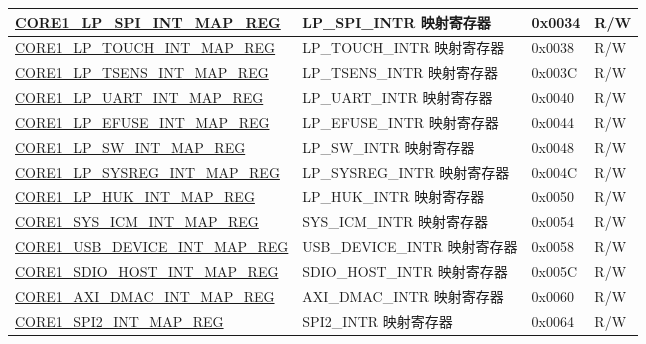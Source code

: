 \begin{longtable}{ | p{8.7cm} | p{6.2cm} | p{1.3cm} | p{1cm} | }
\hyperref[regdesc:CORE1LPSPIINTMAPREG]{CORE1\_LP\_SPI\_INT\_MAP\_REG} & LP\_SPI\_INTR 映射寄存器 & 0x0034 & R/W \\ \hline

\hyperref[regdesc:CORE1LPTOUCHINTMAPREG]{CORE1\_LP\_TOUCH\_INT\_MAP\_REG} & LP\_TOUCH\_INTR 映射寄存器 & 0x0038 & R/W \\ \hline

\hyperref[regdesc:CORE1LPTSENSINTMAPREG]{CORE1\_LP\_TSENS\_INT\_MAP\_REG} & LP\_TSENS\_INTR 映射寄存器 & 0x003C & R/W \\ \hline

\hyperref[regdesc:CORE1LPUARTINTMAPREG]{CORE1\_LP\_UART\_INT\_MAP\_REG} & LP\_UART\_INTR 映射寄存器 & 0x0040 & R/W \\ \hline

\hyperref[regdesc:CORE1LPEFUSEINTMAPREG]{CORE1\_LP\_EFUSE\_INT\_MAP\_REG} & LP\_EFUSE\_INTR 映射寄存器 & 0x0044 & R/W \\ \hline

\hyperref[regdesc:CORE1LPSWINTMAPREG]{CORE1\_LP\_SW\_INT\_MAP\_REG} & LP\_SW\_INTR 映射寄存器 & 0x0048 & R/W \\ \hline

\hyperref[regdesc:CORE1LPSYSREGINTMAPREG]{CORE1\_LP\_SYSREG\_INT\_MAP\_REG} & LP\_SYSREG\_INTR 映射寄存器 & 0x004C & R/W \\ \hline

\hyperref[regdesc:CORE1LPHUKINTMAPREG]{CORE1\_LP\_HUK\_INT\_MAP\_REG} & LP\_HUK\_INTR 映射寄存器 & 0x0050 & R/W \\ \hline

\hyperref[regdesc:CORE1SYSICMINTMAPREG]{CORE1\_SYS\_ICM\_INT\_MAP\_REG} & SYS\_ICM\_INTR 映射寄存器 & 0x0054 & R/W \\ \hline

\hyperref[regdesc:CORE1USBDEVICEINTMAPREG]{CORE1\_USB\_DEVICE\_INT\_MAP\_REG} & USB\_DEVICE\_INTR 映射寄存器 & 0x0058 & R/W \\ \hline

\hyperref[regdesc:CORE1SDIOHOSTINTMAPREG]{CORE1\_SDIO\_HOST\_INT\_MAP\_REG} & SDIO\_HOST\_INTR 映射寄存器 & 0x005C & R/W \\ \hline

\hyperref[regdesc:CORE1AXIDMACINTMAPREG]{CORE1\_AXI\_DMAC\_INT\_MAP\_REG} & AXI\_DMAC\_INTR 映射寄存器 & 0x0060 & R/W \\ \hline

\hyperref[regdesc:CORE1SPI2INTMAPREG]{CORE1\_SPI2\_INT\_MAP\_REG} & SPI2\_INTR 映射寄存器 & 0x0064 & R/W \\ \hline


\end{longtable}

